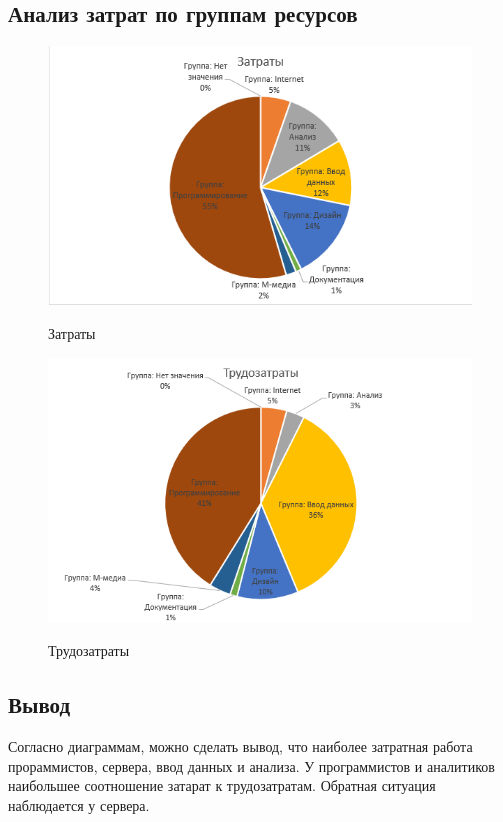 \subsection{Анализ затрат по группам ресурсов}

\begin{figure}[ht!]
	\includegraphics[width=0.75\linewidth]{assets/images/image_2024-02-27_11-16-29.png}
	\label{fig:r2}
	\caption{Затраты}
\end{figure}
\FloatBarrier

\begin{figure}[ht!]
	\includegraphics[width=0.75\linewidth]{assets/images/image_2024-02-27_11-17-48.png}
	\label{fig:r2}
	\caption{Трудозатраты}
\end{figure}
\FloatBarrier

\subsection*{Вывод}

Согласно диаграммам, можно сделать вывод, что наиболее затратная работа прораммистов, сервера, ввод данных и анализа.
У программистов и аналитиков наибольшее соотношение затарат к трудозатратам.
Обратная ситуация наблюдается у сервера.